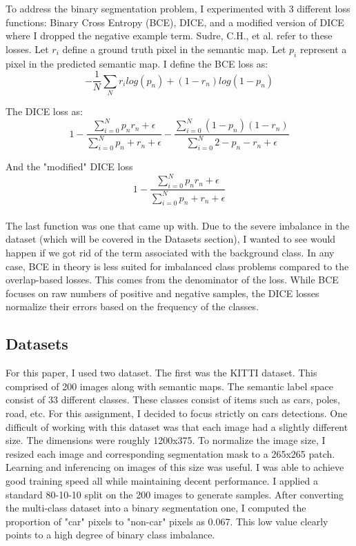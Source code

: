 \documentclass[Location Location Location! : Exploring Image Segmentation Problem In Urban Driving Scenarios]{IEEEtran}
\begin{document}
To address the binary segmentation problem, I experimented with 3 different loss functions: Binary Cross Entropy (BCE), DICE, and a modified version of DICE where I dropped the negative example term. Sudre, C.H., et al. \cite{gen-dice} refer to these losses. Let $r_i$ define a ground truth pixel in the semantic map. Let $p_i$ represent a pixel in the predicted semantic map. I define the BCE loss as: \\


\begin{equation}
-\frac{1}{N} \sum_N r_ilog(p_n) + (1 - r_n)log(1 -p_n)
\end{equation}

The DICE loss as:\\


\begin{equation}
1 -\frac{\sum_{i=0}^N p_nr_n + \epsilon}{\sum_{i=0}^N  p_n + r_n + \epsilon} - \frac{\sum_{i=0}^N  (1 - p_n)(1 - r_n)}{\sum_{i=0}^N  2 - p_n - r_n +\epsilon}
\end{equation}

And the "modified" DICE loss\\


\begin{equation}
1 -\frac{\sum_{i=0}^N p_nr_n + \epsilon}{\sum_{i=0}^N  p_n + r_n + \epsilon} 
\end{equation}\\


The last function was one that came up with. Due to the severe imbalance in the dataset (which will be covered in the Datasets section), I wanted to see would happen if we got rid of the term associated with the background class. In any case, BCE in theory is less suited for imbalanced class problems compared to the overlap-based losses. This comes from the denominator of the loss. While BCE focuses on raw numbers of positive and negative samples, the DICE losses normalize their errors based on the frequency of the classes.  	

\subsection{Datasets}

For this paper, I used two dataset. The first was the KITTI \cite{kitti} dataset. This comprised of 200 images along with semantic maps. The semantic label space consist of 33 different classes. These classes consist of items such as cars, poles, road, etc. For this assignment, I decided to focus strictly on cars detections. One difficult of working with this dataset was that each image had a slightly different size. The dimensions were roughly 1200x375. To normalize the image size, I resized each image and corresponding segmentation mask to a 265x265 patch. Learning and inferencing on images of this size was useful. I was able to achieve good training speed all while maintaining decent performance. I applied a standard 80-10-10 split on the 200 images to generate samples. After converting the multi-class dataset into a binary segmentation one, I computed the proportion of "car" pixels to "non-car" pixels as 0.067. This low value clearly points to a high degree of binary class imbalance. 
\end{document}
